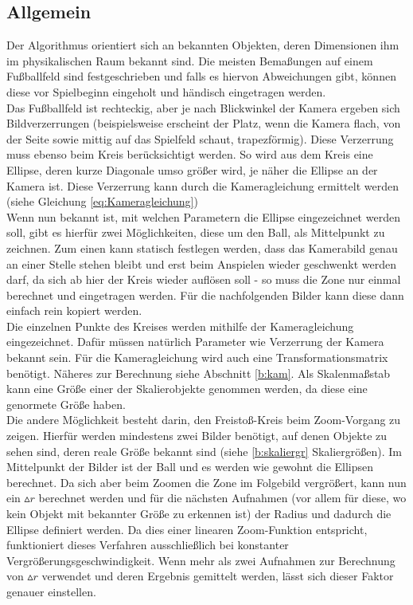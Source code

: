 \documentclass{ezb}
\begin{document}
\subsection{Allgemein}
Der Algorithmus orientiert sich an bekannten Objekten, deren Dimensionen ihm im physikalischen Raum bekannt sind. Die meisten Bemaßungen auf einem Fußballfeld sind festgeschrieben und falls es hiervon Abweichungen gibt, können diese vor Spielbeginn eingeholt und händisch eingetragen werden.\\
\linebreak
Das Fußballfeld ist rechteckig, aber je nach Blickwinkel der Kamera ergeben sich Bildverzerrungen (beispielsweise erscheint der Platz, wenn die Kamera flach, von der Seite sowie mittig auf das Spielfeld schaut, trapezförmig). Diese Verzerrung muss ebenso beim Kreis berücksichtigt werden. So wird aus dem Kreis eine Ellipse, deren kurze Diagonale umso größer wird, je näher die Ellipse an der Kamera ist. Diese Verzerrung kann durch die Kameragleichung ermittelt werden (siehe Gleichung \ref{eq:Kameragleichung})\\
\linebreak
Wenn nun bekannt ist, mit welchen Parametern die Ellipse eingezeichnet werden soll, gibt es hierfür zwei Möglichkeiten, diese um den Ball, als Mittelpunkt zu zeichnen. Zum einen kann statisch festlegen werden, dass das Kamerabild genau an einer Stelle stehen bleibt und erst beim Anspielen wieder geschwenkt werden darf, da sich ab hier der Kreis wieder auflösen soll - so muss die Zone nur einmal berechnet und eingetragen werden. Für die nachfolgenden Bilder
kann diese dann einfach rein kopiert werden.\\ 
\linebreak
Die einzelnen Punkte des Kreises werden mithilfe der Kameragleichung eingezeichnet. Dafür müssen natürlich Parameter wie Verzerrung der Kamera bekannt sein. Für die Kameragleichung wird auch eine Transformationsmatrix benötigt. Näheres zur Berechnung siehe Abschnitt \ref{b:kam}. Als Skalenmaßstab kann eine Größe einer der Skalierobjekte genommen werden, da diese eine genormete Größe haben.\\
\linebreak
Die andere Möglichkeit besteht darin, den Freistoß-Kreis beim Zoom-Vorgang zu zeigen. Hierfür werden mindestens zwei Bilder benötigt, auf denen Objekte zu sehen sind, deren reale Größe bekannt sind (siehe \ref{b:skaliergr} Skaliergrößen). Im Mittelpunkt der Bilder ist der Ball und es werden wie gewohnt die Ellipsen berechnet. Da sich aber beim Zoomen die Zone im Folgebild vergrößert, kann nun ein $\vartriangle r$ berechnet werden und für die nächsten Aufnahmen (vor allem für diese, wo kein Objekt mit bekannter Größe zu erkennen ist) der Radius und dadurch die Ellipse definiert werden. Da dies einer linearen Zoom-Funktion entspricht, funktioniert dieses Verfahren ausschließlich bei konstanter Vergrößerungsgeschwindigkeit. Wenn mehr als zwei Aufnahmen zur Berechnung von $\vartriangle r$ verwendet und deren Ergebnis gemittelt werden, lässt sich dieser Faktor genauer einstellen.\\
\end{document}
